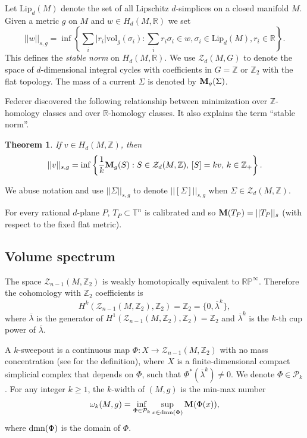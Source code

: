 \documentclass[11pt]{amsart}
\def\R{\mathbb R}
\def\Z{\mathbb Z}
\newcommand{\T}{\mathbb T}
\newtheorem{thm}{Theorem}[section]
\theoremstyle{remark}
\theoremstyle{definition}
\begin{document}
	
	
	Let $\text{Lip}_d(M)$ denote the set of all Lipschitz $d$-simplices on a closed manifold $M$. Given a metric $g$ on $M$ and $w\in H_d(M,\R)$ we set
	\begin{equation}\label{stable.norm.defi}
		||w||_{s,g}=\inf\left\{\sum_i |r_i|\text{vol}_g(\sigma_i):\sum_i r_i\sigma_i\in w, \sigma_i\in\text{Lip}_d(M), r_i\in\R \right\}.
	\end{equation}
	This defines the {\em stable norm} on $H_d(M,\R)$.    We use 
	$\mathcal{Z}_d(M,G)$ to denote the space of $d$-dimensional integral cycles with coefficients in $G=\Z$ or $\Z_2$ with the flat topology.  The mass of a current $\Sigma$ is denoted by ${\bf M}_g(\Sigma)$.
	
	Federer \cite[Section 5.8]{Federer74} discovered the following relationship between minimization over $\Z$-homology classes and over $\R$-homology classes. It also explains the term ``stable norm''.	
	\begin{thm}\label{thm.Federer}
		If $v\in H_d(M,\Z)$, then
		\begin{equation}\label{Federer.stable.norm}
			||v||_{s,g}=\inf\left\{\frac1k {\bf M}_g(S):S\in\mathcal Z_d(M,\Z),\, [S]=kv,\,{k\in\Z_+}\right\}.
		\end{equation}
	\end{thm}
	We abuse notation and use $||\Sigma||_{s,g}$ to denote $||[\Sigma]||_{s,g}$ when $\Sigma\in\mathcal Z_d(M,\Z)$.
	
	{For every rational $d$-plane $P$, $T_P\subset \T^n$ is calibrated and so ${\bf M}(T_P)=||T_P||_s$ (with respect to the fixed flat metric).}
	
	
	{\subsection{Volume spectrum}\label{vs.defi}
		
		The space $\mathcal{Z}_{n-1}(M,\mathbb{Z}_2)$ is weakly homotopically equivalent to $\mathbb{RP}^\infty$. Therefore the cohomology with $\mathbb{Z}_2$ coefficients is
		$$
		H^k(\mathcal{Z}_{n-1}(M,\mathbb{Z}_2), \mathbb{Z}_2)=\mathbb{Z}_2=\{0, \overline{\lambda}^k\},
		$$
		where $\overline{\lambda}$ is the generator of $H^1(\mathcal{Z}_{n-1}(M,\mathbb{Z}_2), \mathbb{Z}_2)=\mathbb{Z}_2$ and  $\overline{\lambda}^k$ is the $k$-th cup power of $\overline{\lambda}$.
		
		A $k$-sweepout is a continuous map $\Phi:X \rightarrow \mathcal{Z}_{n-1}(M,\mathbb{Z}_2)$ with no mass concentration (see \cite{mnindex} for the definition), where  $X$ is a finite-dimensional compact simplicial complex that depends on $\Phi$, such that
		$
		\Phi^*(\overline{\lambda}^k)\neq 0.
		$
		We denote $\Phi \in \mathcal{P}_k$. For any integer $k\geq 1$, the $k$-width of $(M,g)$ is the min-max number
		$$
		\omega_k(M,g)= \inf_{\Phi\in \mathcal{P}_k} \sup_{x\in {\rm dmn}(\Phi)} {\bf M}(\Phi(x)),
		$$
		where  ${\rm dmn}(\Phi)$ is the domain of $\Phi$.  
		
	}	
\end{document}
